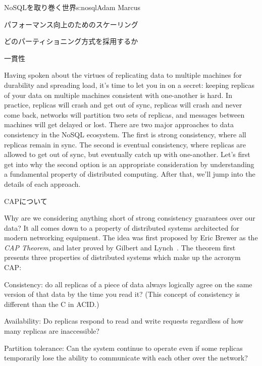 \begin{aosachapter}{NoSQLを取り巻く世界}{s:nosql}{Adam Marcus}
\begin{aosasect1}{パフォーマンス向上のためのスケーリング}
\begin{aosasect2}{どのパーティショニング方式を採用するか}
\end{aosasect2}

\end{aosasect1}

\begin{aosasect1}{一貫性}
\label{sec.nosql.consistency}

Having spoken about the virtues of replicating data to multiple
machines for durability and spreading load, it's time to let you in on
a secret: keeping replicas of your data on multiple machines
consistent with one-another is hard.  In practice, replicas will crash
and get out of sync, replicas will crash and never come back, networks
will partition two sets of replicas, and messages between machines
will get delayed or lost.  There are two major approaches to data
consistency in the NoSQL ecosystem.  The first is strong consistency, where all
replicas remain in sync.  The second is eventual consistency, where replicas are
allowed to get out of sync, but eventually catch up with one-another.
Let's first get into why the second option is an appropriate
consideration by understanding a fundamental property of distributed
computing.  After that, we'll jump into the details of each approach.

\begin{aosasect2}{CAPについて}

Why are we considering anything short of strong consistency guarantees
over our data?  It all comes down to a property of distributed systems
architected for modern networking equipment.  The idea was first
proposed by Eric Brewer as the \emph{CAP Theorem}, and later proved by
Gilbert and Lynch~\cite{bib:captheorem}.  The theorem first presents three
properties of distributed systems which make up the acronym CAP:

\begin{aosadescription}

  \item{Consistency}: do all replicas of a piece of data always
  logically agree on the same version of that data by the time you
  read it?  (This concept of consistency is different than the C in ACID.)

  \item{Availability}: Do replicas respond to read and write requests regardless
  of how many replicas are inaccessible?

  \item{Partition tolerance}: Can the system continue to operate
  even if some replicas temporarily lose the ability to communicate
  with each other over the network?


\end{aosadescription}
\end{aosasect2}
\end{aosasect1}
\end{aosachapter}
